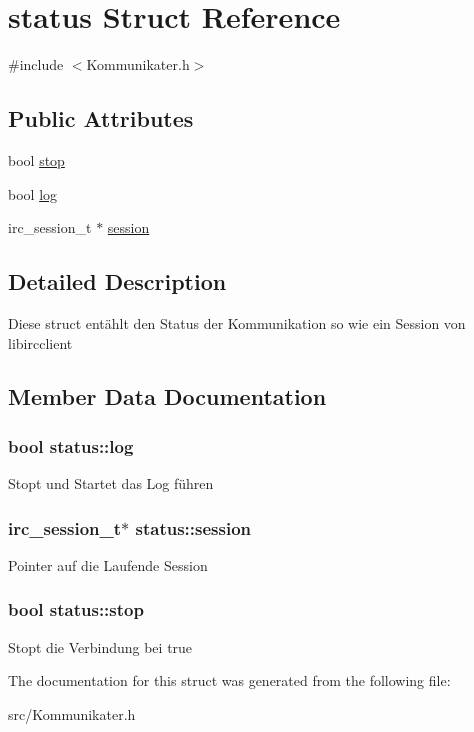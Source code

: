 \hypertarget{structstatus}{\section{status \-Struct \-Reference}
\label{structstatus}
}


{\ttfamily \#include $<$\-Kommunikater.\-h$>$}

\subsection*{\-Public \-Attributes}
{\bf }\par
\begin{DoxyCompactItemize}
\item 
bool \hyperlink{structstatus_a48af972bd617d6e094dfd95e825d0b65}{stop}
\item 
bool \hyperlink{structstatus_aefff68244177166864b3f8f5672d278d}{log}
\item 
irc\-\_\-session\-\_\-t $\ast$ \hyperlink{structstatus_a76b9424af54c081da3b8e10b8987297e}{session}
\end{DoxyCompactItemize}



\subsection{\-Detailed \-Description}
\-Diese struct entählt den \-Status der \-Kommunikation so wie ein \-Session von libircclient 

\subsection{\-Member \-Data \-Documentation}
\hypertarget{structstatus_aefff68244177166864b3f8f5672d278d}{
\subsubsection[{log}]{\setlength{\rightskip}{0pt plus 5cm}bool {\bf status\-::log}}}\label{structstatus_aefff68244177166864b3f8f5672d278d}
\-Stopt und \-Startet das \-Log führen \hypertarget{structstatus_a76b9424af54c081da3b8e10b8987297e}{
\subsubsection[{session}]{\setlength{\rightskip}{0pt plus 5cm}irc\-\_\-session\-\_\-t$\ast$ {\bf status\-::session}}}\label{structstatus_a76b9424af54c081da3b8e10b8987297e}
\-Pointer auf die \-Laufende \-Session \hypertarget{structstatus_a48af972bd617d6e094dfd95e825d0b65}{
\subsubsection[{stop}]{\setlength{\rightskip}{0pt plus 5cm}bool {\bf status\-::stop}}}\label{structstatus_a48af972bd617d6e094dfd95e825d0b65}
\-Stopt die \-Verbindung bei true 

\-The documentation for this struct was generated from the following file\-:\begin{DoxyCompactItemize}
\item 
src/\-Kommunikater.\-h\end{DoxyCompactItemize}
